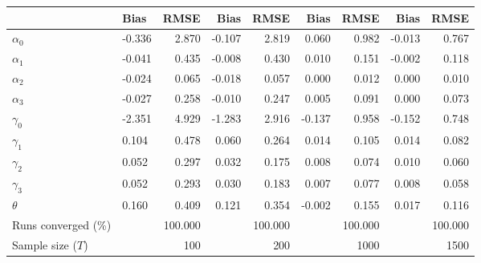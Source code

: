 
\begin{tabular}[t]{llrrrrrrr}
\toprule
  & Bias & RMSE & Bias & RMSE & Bias & RMSE & Bias & RMSE\\
\midrule
$\alpha_{0}$ & -0.336 & 2.870 & -0.107 & 2.819 & 0.060 & 0.982 & -0.013 & 0.767\\
$\alpha_{1}$ & -0.041 & 0.435 & -0.008 & 0.430 & 0.010 & 0.151 & -0.002 & 0.118\\
$\alpha_{2}$ & -0.024 & 0.065 & -0.018 & 0.057 & 0.000 & 0.012 & 0.000 & 0.010\\
$\alpha_{3}$ & -0.027 & 0.258 & -0.010 & 0.247 & 0.005 & 0.091 & 0.000 & 0.073\\
$\gamma_{0}$ & -2.351 & 4.929 & -1.283 & 2.916 & -0.137 & 0.958 & -0.152 & 0.748\\
$\gamma_{1}$ & 0.104 & 0.478 & 0.060 & 0.264 & 0.014 & 0.105 & 0.014 & 0.082\\
$\gamma_{2}$ & 0.052 & 0.297 & 0.032 & 0.175 & 0.008 & 0.074 & 0.010 & 0.060\\
$\gamma_{3}$ & 0.052 & 0.293 & 0.030 & 0.183 & 0.007 & 0.077 & 0.008 & 0.058\\
$\theta$ & 0.160 & 0.409 & 0.121 & 0.354 & -0.002 & 0.155 & 0.017 & 0.116\\
Runs converged (\%) &  & 100.000 &  & 100.000 &  & 100.000 &  & 100.000\\
Sample size ($T$) &  & 100 &  & 200 &  & 1000 &  & 1500\\
\bottomrule
\end{tabular}
